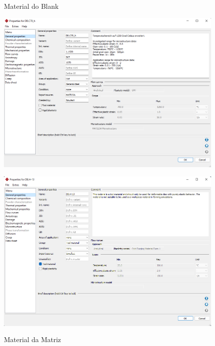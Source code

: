 \documentclass[deposito, acronym, symbols]{fei}
\begin{document}
\begin{figure}[!htp]
  \centering
  \begin{minipage}{0.4\textwidth}
    \centering
    \caption{Material do Blank}
    \includegraphics[width=1\linewidth]{Imagens/Simufact - Material do Forjado.png}
    \label{fig:Mforjado}
  \end{minipage}
  \hfill
  \begin{minipage}{0.4\textwidth}
        \caption{Material da Matriz}
    \includegraphics[width=1\linewidth]{Imagens/Simufact - Material da Matriz.png}
    \label{fig:Mmatriz}
  \end{minipage}
\end{figure}
\end{document}
